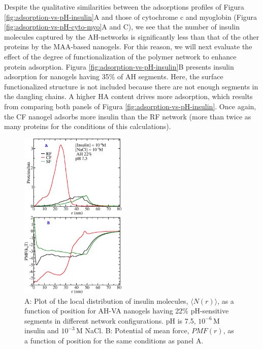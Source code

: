 {Despite the qualitative similarities between the adsorptions profiles of
Figura \ref{fig:adsorption-vs-pH-insulin}A and those of cytochrome c and myoglobin (Figura \ref{fig:adsorption-vs-pH-cyto-myo}A and C), we see that the number of insulin molecules captured by the AH-networks is significantly less than that of the other proteins by the MAA-based nanogels.
For this reason, we  will next evaluate the effect of the degree of functionalization of the polymer network to enhance protein adsorption.
Figura \ref{fig:adsorption-vs-pH-insulin}B presents insulin adsorption for nanogels having 35\% of AH segments.
Here, the surface functionalized structure is not included because there are not enough segments in the dangling chains.
A higher HA content drives more adsorption, which results from comparing both panels of Figura \ref{fig:adsorption-vs-pH-insulin}.
Once again, the CF nanogel adsorbs more insulin than the RF network (more than twice as many proteins for the conditions of this calculations).




\begin{figure}[!htb]
    \centering
    \includegraphics[width=0.45\textwidth]{Figures/graphs-gel2/insu-ads-pmf.png}
    \caption{A: Plot of the local distribution of insulin molecules, $\langle N(r)\rangle$, as a function of position for AH-VA nanogels having 22\% pH-sensitive segments in different network configurations.
    pH is 7.5, $10^{-6}$\,M insulin and  $10^{-3}$\,M NaCl.
    B: Potential of mean force,  ${PMF}(r)$, as a function of position for the same conditions as panel A.}
    \label{fig:adsorption-vs-r-insulin}
\end{figure}



}
